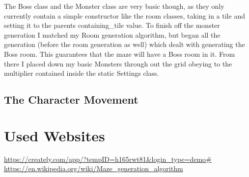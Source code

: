 \documentclass[12pt]{article}
\begin{document}
The Boss class and the Monster class are very basic though, as they only currently contain a simple constructor like the room classes, taking in a tile and setting it to the parents containing\_tile value. To finish off the monster generation I matched my Room generation algorithm, but began all the generation (before the room generation as well) which dealt with generating the Boss room. This guarantees that the maze will have a Boss room in it. From there I placed down my basic Monsters through out the grid obeying to the multiplier contained inside the static Settings class.

\subsection{The Character Movement}


\section{Used Websites}

\url{https://creately.com/app/?tempID=h165rwt81&login_type=demo#}\newline
\url{https://en.wikipedia.org/wiki/Maze_generation_algorithm}
\end{document}
